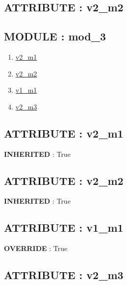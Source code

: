 \subsection*{ATTRIBUTE : v2\_m2}
\hypertarget{ecldoc:intest.inintest.example_2_intest.inintest.example_2.mod_2.v2_m2}{}

\subsection*{MODULE : mod\_3}
\hypertarget{ecldoc:intest.inintest.example_2_intest.inintest.example_2.mod_3}{}
\begin{enumerate}
\item \hyperlink{ecldoc:intest.inintest.example_2_intest.inintest.example_2.mod_1.v2_m1}{v2\_m1}
\item \hyperlink{ecldoc:intest.inintest.example_2_intest.inintest.example_2.mod_2.v2_m2}{v2\_m2}
\item \hyperlink{ecldoc:intest.inintest.example_2_intest.inintest.example_2.mod_3.v1_m1}{v1\_m1}
\item \hyperlink{ecldoc:intest.inintest.example_2_intest.inintest.example_2.mod_3.v2_m3}{v2\_m3}
\end{enumerate}
\subsection*{ATTRIBUTE : v2\_m1}
\hypertarget{ecldoc:intest.inintest.example_2_intest.inintest.example_2.mod_1.v2_m1}{}
\textbf{INHERITED} : True \\
\subsection*{ATTRIBUTE : v2\_m2}
\hypertarget{ecldoc:intest.inintest.example_2_intest.inintest.example_2.mod_2.v2_m2}{}
\textbf{INHERITED} : True \\
\subsection*{ATTRIBUTE : v1\_m1}
\hypertarget{ecldoc:intest.inintest.example_2_intest.inintest.example_2.mod_3.v1_m1}{}
\textbf{OVERRIDE} : True \\
\subsection*{ATTRIBUTE : v2\_m3}
\hypertarget{ecldoc:intest.inintest.example_2_intest.inintest.example_2.mod_3.v2_m3}{}

